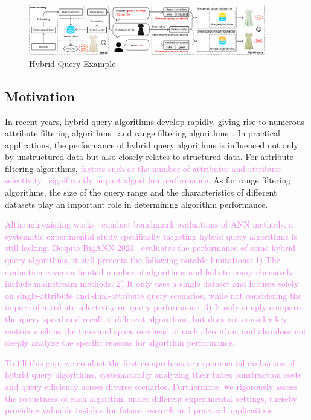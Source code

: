 \documentclass[sigconf, nonacm]{acmart}
\begin{document}
	\begin{figure}
		\centering
		
		\includegraphics[width=0.92\textwidth]{figures/hybrid ANNS.pdf}
		\caption{Hybrid Query Example}
		
		\label{fig:hybrid ANNS}
	\end{figure}
	\subsection{Motivation}
	In recent years, hybrid query algorithms develop rapidly, giving rise to numerous attribute filtering algorithms~\cite{NHQ,diskann} and range filtering algorithms~\cite{serf,iRangeGraph}. In practical applications, the performance of hybrid query algorithms is influenced not only by unstructured data but also closely relates to structured data. For attribute filtering algorithms, \textcolor{violet}{factors such as the number of attributes and attribute selectivity~\cite{analyticdb,milvus} significantly impact algorithm performance.} As for range filtering algorithms, the size of the query range and the characteristics of different datasets play an important role in determining algorithm performance.
	
	\textcolor{violet}{Although existing works~\cite{compare,azizi2025graph} conduct benchmark evaluations of ANN methods, a systematic experimental study specifically targeting hybrid query algorithms is still lacking. Despite BigANN 2023~\cite{bigann2023} evaluates the performance of some hybrid query algorithms, it still presents the following notable limitations:
	1) The evaluation covers a limited number of algorithms and fails to comprehensively include mainstream methods.
	2) It only uses a single dataset and focuses solely on single-attribute and dual-attribute query scenarios, while not considering the impact of attribute selectivity on query performance.
	3) It only simply compares the query speed and recall of different algorithms, but does not consider key metrics such as the time and space overhead of each algorithm, and also does not deeply analyze the specific reasons for algorithm performance.}
	
	\textcolor{violet}{To fill this gap, we conduct the first comprehensive experimental evaluation of hybrid query algorithms, systematically analyzing their index construction costs and query efficiency across diverse scenarios. Furthermore, we rigorously assess the robustness of each algorithm under different experimental settings, thereby providing valuable insights for future research and practical applications.}
	
\end{document}
